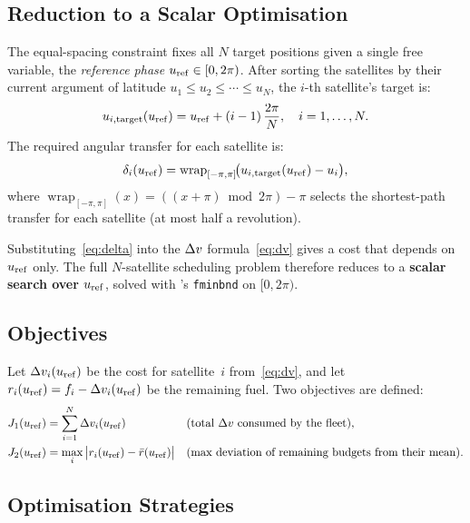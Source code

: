 \subsection{Reduction to a Scalar Optimisation}
\label{sec:reduction}

The equal-spacing constraint fixes all $N$ target positions given a
single free variable, the \emph{reference phase} $u_\mathrm{ref} \in [0, 2\pi)$.
After sorting the satellites by their current argument of latitude
$u_1 \le u_2 \le \cdots \le u_N$, the $i$-th satellite's target is:
\begin{equation}
  u_{i,\text{target}}(u_\mathrm{ref})
    = u_\mathrm{ref} + (i-1)\,\frac{2\pi}{N},
  \quad i = 1, \dots, N.
  \label{eq:target}
\end{equation}
The required angular transfer for each satellite is:
\begin{equation}
  \delta_i(u_\mathrm{ref})
    = \operatorname{wrap}_{[-\pi,\pi]}\!\bigl(u_{i,\text{target}}(u_\mathrm{ref}) - u_i\bigr),
  \label{eq:delta}
\end{equation}
where $\operatorname{wrap}_{[-\pi,\pi]}(x) = ((x + \pi) \bmod 2\pi) - \pi$
selects the shortest-path transfer for each satellite (at most half a revolution).

Substituting~\eqref{eq:delta} into the $\Delta v$ formula~\eqref{eq:dv} gives
a cost that depends on $u_\mathrm{ref}$ only. The full $N$-satellite scheduling problem
therefore reduces to a \textbf{scalar search over $u_\mathrm{ref}$}, solved
with \MATLAB's \texttt{fminbnd} on $[0, 2\pi)$.

\subsection{Objectives}
\label{sec:objectives}

Let $\Delta v_i(u_\mathrm{ref})$ be the cost for satellite~$i$ from~\eqref{eq:dv},
and let $r_i(u_\mathrm{ref}) = f_i - \Delta v_i(u_\mathrm{ref})$ be the remaining fuel. Two
objectives are defined:
\begin{align}
  J_1(u_\mathrm{ref}) &= \sum_{i=1}^{N} \Delta v_i(u_\mathrm{ref})
    && \text{(total $\Delta v$ consumed by the fleet),}
    \label{eq:J1}\\
  J_2(u_\mathrm{ref}) &= \max_{i}\,\bigl|r_i(u_\mathrm{ref}) - \bar{r}(u_\mathrm{ref})\bigr|
    && \text{(max deviation of remaining budgets from their mean).}
    \label{eq:J2}
\end{align}

\subsection{Optimisation Strategies}


